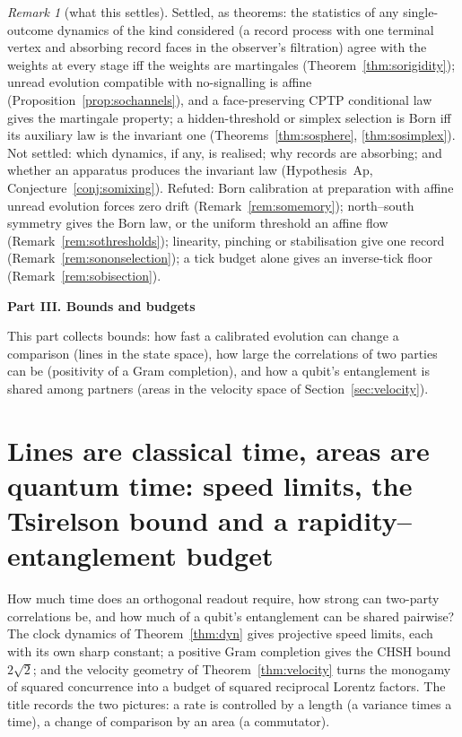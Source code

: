 \documentclass[aps,pra,onecolumn,superscriptaddress,nofootinbib,10pt]{revtex4-2}
\theoremstyle{definition}
\theoremstyle{remark}
\newtheorem{remark}[theorem]{Remark}
\newcommand{\paperpart}[1]{\par\bigskip\begin{center}\large\bfseries #1\end{center}\par\medskip}
\begin{document}
\begin{remark}[what this settles]\label{rem:sosettles}
Settled, as theorems: the statistics of any single-outcome dynamics of the kind considered (a record
process with one terminal vertex and absorbing record faces in the observer's filtration) agree with the
weights at every stage iff the weights are martingales (Theorem~\ref{thm:sorigidity}); unread evolution compatible
with no-signalling is affine (Proposition~\ref{prop:sochannels}), and a face-preserving CPTP conditional law gives the
martingale property; a hidden-threshold or simplex selection is Born iff its auxiliary law is the invariant
one (Theorems~\ref{thm:sosphere}, \ref{thm:sosimplex}).  Not settled: which dynamics, if any, is realised; why records
are absorbing; and whether an apparatus produces the invariant law (Hypothesis~Ap, Conjecture~\ref{conj:somixing}).
Refuted: Born calibration at preparation with affine unread evolution forces zero drift
(Remark~\ref{rem:somemory}); north--south symmetry gives the Born law, or the uniform threshold an affine flow
(Remark~\ref{rem:sothresholds}); linearity, pinching or stabilisation give one record (Remark~\ref{rem:sononselection}); a tick
budget alone gives an inverse-tick floor (Remark~\ref{rem:sobisection}).
\end{remark}


\paperpart{Part III.  Bounds and budgets}
\noindent This part collects bounds: how fast a calibrated evolution can change a comparison (lines in the
state space), how large the correlations of two parties can be (positivity of a Gram completion), and how
a qubit's entanglement is shared among partners (areas in the velocity space of Section~\ref{sec:velocity}).

\section{Lines are classical time, areas are quantum time: speed limits, the Tsirelson bound and a rapidity--entanglement budget}\label{sec:bounds}
How much time does an orthogonal readout require, how strong can two-party correlations be, and how much
of a qubit's entanglement can be shared pairwise?  The clock dynamics of Theorem~\ref{thm:dyn} gives projective
speed limits, each with its own sharp constant; a positive Gram completion gives the CHSH bound $2\sqrt2$; and
the velocity geometry of Theorem~\ref{thm:velocity} turns the monogamy of squared concurrence into a budget of
squared reciprocal Lorentz factors.  The title records the two pictures: a rate is controlled by a length
(a variance times a time), a change of comparison by an area (a commutator).
\end{document}
